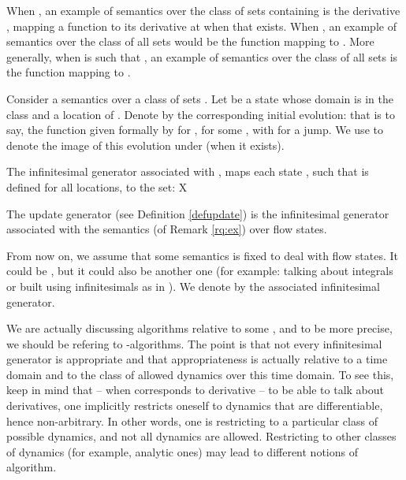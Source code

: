\documentclass[envcountsame]{llncs}
\newcommand{\nd}[1]{#1}\let\ep\endproof
\renewcommand{\endproof}{\qed\ep}
\begin{document}
\begin{remark} \label{rq:ex}
When , an example of
semantics over the class of sets  containing  is the derivative , mapping a function
 to its
derivative at  when that exists. When , an example of
semantics over the class of all sets would be the function  mapping
 to . More generally, when  is such that , an example of
semantics over the class of all sets is the function  mapping
 to .
\end{remark}

Consider a semantics  over a class of sets .
Let  be a state whose domain is in the class and a location 
of .  Denote by  the corresponding initial
evolution: that is to say, the
function given formally by  for , for some , with  for a jump.
We use  to denote the image of this evolution under  (when it exists).

\begin{definition} The infinitesimal generator associated with ,
 maps each state , such that  is defined for all locations, to
the set: X
\end{definition}

The update generator  (see Definition
\ref{defupdate}) is the infinitesimal generator associated with the
semantics  (of Remark \ref{rq:ex}) over flow states. 

From now on, we assume that some semantics  is fixed to deal
with flow states. It could be
, but it could also be another one (for example:
talking about integrals or built using infinitesimals as in \cite{rust2000hybrid}).  We denote by
 the associated infinitesimal generator.


We are actually discussing algorithms relative to some
    , and to be more precise, we should be refering to -algorithms.
The point is that not every infinitesimal generator is appropriate
    and that appropriateness is actually relative to a time domain and
    to the class of allowed dynamics over this time domain.
\nd{To see this, keep in mind that -- when  corresponds to derivative
    -- to be able to talk about
    derivatives, one implicitly restricts oneself to dynamics that are
    differentiable, hence non-arbitrary. In other words, one is restricting
    to a particular class of possible dynamics, and not all dynamics
    are allowed. Restricting to other classes of dynamics (for example, analytic
    ones) may lead to  different notions of algorithm.}
\end{document}
